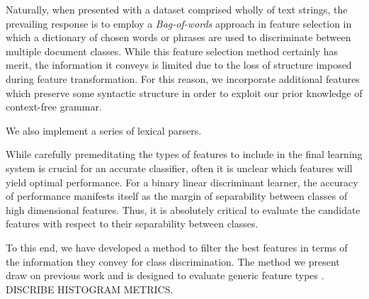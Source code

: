 
Naturally, when presented with a dataset comprised wholly of text strings, the prevailing response is to employ a \emph{Bag-of-words} approach in feature selection in which a dictionary of chosen words or phrases are used to discriminate between multiple document classes. While this feature selection method certainly has merit, the information it conveys is limited due to the loss of structure imposed during feature transformation. For this reason, we incorporate additional features which preserve some syntactic structure in order to exploit our prior knowledge of context-free grammar.

We also implement a series of lexical parsers.

While carefully premeditating the types of features to include in the final learning system is crucial for an accurate classifier, often it is unclear which features will yield optimal performance. For a binary linear discriminant learner, the accuracy of performance manifests itself as the margin of separability between classes of high dimensional features. Thus, it is absolutely critical to evaluate the candidate features with respect to their separability between classes.

To this end, we have developed a method to filter the best features in terms of the information they convey for class discrimination. The method we present draw on previous work and is designed to evaluate generic feature types \cite{french}.
DISCRIBE HISTOGRAM METRICS.